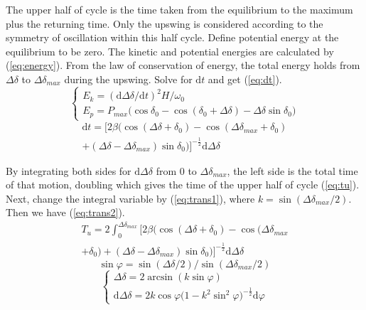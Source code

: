 \documentclass[journal]{IEEEtran}
\begin{document}
The upper half of cycle is the time taken from the equilibrium to the maximum plus the returning time. Only the upswing is considered according to the symmetry of oscillation within this half cycle. Define potential energy at the equilibrium to be zero. The kinetic and potential energies are calculated by (\ref{eq:energy}). From the law of conservation of energy, the total energy holds from $\Delta\delta$ to $\Delta\delta_{max}$ during the upswing. Solve for $\textrm{d}t$ and get (\ref{eq:dt}).
\begin{equation} \label{eq:energy}
\left\{ \begin{array}{ll}
E_{k}=(\textrm{d}\Delta\delta/\textrm{d}t)^{2}H/\omega_{0} \\
E_{p}=P_{max}\bigr(\cos\delta_{0}-\cos(\delta_{0}+\Delta\delta)-\Delta\delta\sin\delta_{0}\bigr)
\end{array} \right.
\end{equation}
\begin{eqnarray} \label{eq:dt}
\textrm{d}t=\bigl[2\beta\bigl(\cos(\Delta\delta+\delta_{0})-\cos(\Delta\delta_{max}+\delta_{0})\nonumber\\
+(\Delta\delta-\Delta\delta_{max})\sin\delta_{0}\bigl)\bigr]^{-\frac{1}{2}}\textrm{d}\Delta\delta
\end{eqnarray}

By integrating both sides for $\textrm{d}\Delta\delta$ from 0 to $\Delta\delta_{max}$, the left side is the total time of that motion, doubling which gives the time of the upper half of cycle (\ref{eq:tu}). Next, change the integral variable by (\ref{eq:trans1}), where $k=\sin(\Delta\delta_{max}/2)$. Then we have (\ref{eq:trans2}).
\begin{eqnarray} \label{eq:tu}
T_{u}=2\int_{0}^{\Delta\delta_{max}}\bigl[2\beta\bigl(\cos(\Delta\delta+\delta_{0})-\cos(\Delta\delta_{max}\nonumber\\
+\delta_{0})+(\Delta\delta-\Delta\delta_{max})\sin\delta_{0}\bigl)\bigr]^{-\frac{1}{2}}\textrm{d}\Delta\delta
\end{eqnarray}
\begin{equation} \label{eq:trans1}
\sin\varphi=\sin(\Delta\delta/2)/\sin(\Delta\delta_{max}/2)
\end{equation}
\begin{equation} \label{eq:trans2}
\left\{ \begin{array}{ll}
\Delta\delta=2\arcsin(k\sin\varphi) \\
\textrm{d}\Delta\delta=2k\cos\varphi({1-k^{2}\sin^{2}\varphi)^{-\frac{1}{2}}}\textrm{d}\varphi
\end{array} \right.
\end{equation}
\end{document}
